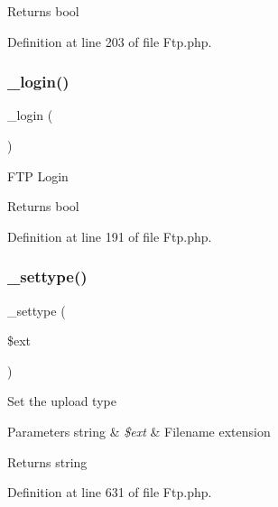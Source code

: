 \begin{DoxyReturn}{Returns}
bool 
\end{DoxyReturn}


Definition at line 203 of file Ftp.\+php.

\mbox{\label{class_c_i___f_t_p_a95562e7b8a41561f4b0b525d9c7fe701}} 
\subsubsection{\texorpdfstring{\_login()}{\_login()}}
{\footnotesize\ttfamily \+\_\+login (\begin{DoxyParamCaption}{ }\end{DoxyParamCaption})\hspace{0.3cm}{\ttfamily [protected]}}

F\+TP Login

\begin{DoxyReturn}{Returns}
bool 
\end{DoxyReturn}


Definition at line 191 of file Ftp.\+php.

\mbox{\label{class_c_i___f_t_p_aacd9d6628615078d8df9aab1fe70e391}} 
\subsubsection{\texorpdfstring{\_settype()}{\_settype()}}
{\footnotesize\ttfamily \+\_\+settype (\begin{DoxyParamCaption}\item[{}]{\$ext }\end{DoxyParamCaption})\hspace{0.3cm}{\ttfamily [protected]}}

Set the upload type


\begin{DoxyParams}[1]{Parameters}
string & {\em \$ext} & Filename extension \\
\hline
\end{DoxyParams}
\begin{DoxyReturn}{Returns}
string 
\end{DoxyReturn}


Definition at line 631 of file Ftp.\+php.

